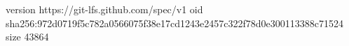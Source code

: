 version https://git-lfs.github.com/spec/v1
oid sha256:972d0719f5c782a0566075f38e17cd1243e2457c322f78d0e300113388c71524
size 43864
